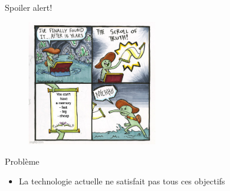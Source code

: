 \documentclass[8pt]{beamer}
\begin{document}
\begin{frame}{Spoiler alert!}
    \begin{figure}
        \centering
        \includegraphics[width=0.5\textwidth]{figures/meme.jpg}
        \label{fig:memory_speed}
    \end{figure}

    \begin{alertblock}{Problème}
        \begin{itemize}
            \item La technologie actuelle ne satisfait pas tous ces objectifs
        \end{itemize}
    \end{alertblock}
\end{frame}
\end{document}
